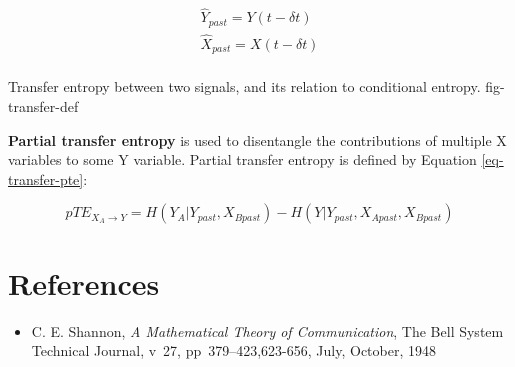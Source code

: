 \begin{equation}
\begin{array}{cc}
\hat{Y}_{past} = Y(t - \delta t) \\
\hat{X}_{past} = X(t - \delta t) \\
\end{array}
\label{eq-transfer-past}
\end{equation}

{Transfer entropy between two signals, and its relation to conditional
entropy.}
{fig-transfer-def}

\textbf{Partial transfer entropy} is used to disentangle the contributions
of multiple X variables to some Y variable. Partial transfer entropy is
defined by Equation \ref{eq-transfer-pte}:

\begin{equation}
pTE_{X_A \rightarrow Y} = H(Y_A|Y_{past},X_{Bpast})
- H(Y|Y_{past},X_{Apast},X_{Bpast})
\label{eq-transfer-pte}
\end{equation}

\section{References}
\label{sect-entropy-refs}

\begin{itemize}
%
\item C. E. Shannon, \textit{A Mathematical Theory of Communication},
The Bell System Technical Journal, v~27, pp~379--423,623-656, July, October,
1948
%
\end{itemize}

%
